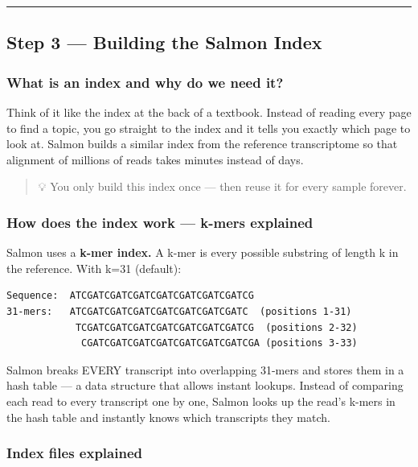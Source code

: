 \documentclass[
]{article}
\begin{document}
\begin{center}\rule{0.5\linewidth}{0.5pt}\end{center}

\subsection{Step 3 --- Building the Salmon
Index}\label{step-3-building-the-salmon-index}

\subsubsection{What is an index and why do we need
it?}\label{what-is-an-index-and-why-do-we-need-it}

Think of it like the index at the back of a textbook. Instead of reading
every page to find a topic, you go straight to the index and it tells
you exactly which page to look at. Salmon builds a similar index from
the reference transcriptome so that alignment of millions of reads takes
minutes instead of days.

\begin{quote}
💡 You only build this index once --- then reuse it for every sample
forever.
\end{quote}

\subsubsection{How does the index work --- k-mers
explained}\label{how-does-the-index-work-k-mers-explained}

Salmon uses a \textbf{k-mer index.} A k-mer is every possible substring
of length k in the reference. With k=31 (default):

\begin{verbatim}
Sequence:  ATCGATCGATCGATCGATCGATCGATCGATCG
31-mers:   ATCGATCGATCGATCGATCGATCGATCGATC  (positions 1-31)
            TCGATCGATCGATCGATCGATCGATCGATCG  (positions 2-32)
             CGATCGATCGATCGATCGATCGATCGATCGA (positions 3-33)
\end{verbatim}

Salmon breaks EVERY transcript into overlapping 31-mers and stores them
in a hash table --- a data structure that allows instant lookups.
Instead of comparing each read to every transcript one by one, Salmon
looks up the read's k-mers in the hash table and instantly knows which
transcripts they match.

\subsubsection{Index files explained}\label{index-files-explained}
\end{document}
